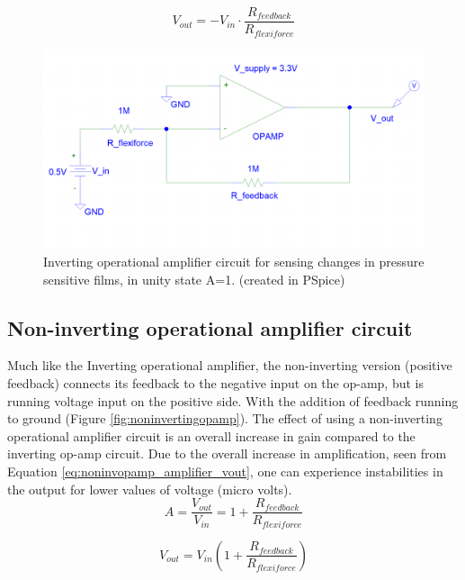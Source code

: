 \begin{equation}
\label{eq:invopamp_amplifier_vout}
    V_{out}= -V_{in} \cdot \frac{R_{feedback}}{R_{flexiforce}}
\end{equation}

\begin{figure}
    \centering
    \includegraphics[width=.985\linewidth]{figures/inverting_opamp.png}
    \caption{Inverting operational amplifier circuit for sensing changes in pressure sensitive films, in unity state A=1. (created in PSpice)}
    \label{fig:invertingopamp}
\end{figure}


\subsection{Non-inverting operational amplifier circuit}
\label{subsec:noninvopamp}
Much like the Inverting operational amplifier, the non-inverting version (positive feedback) connects its feedback to the negative input on the op-amp, but is running voltage input on the positive side. With the addition of feedback running to ground (Figure \ref{fig:noninvertingopamp}). The effect of using a non-inverting operational amplifier circuit is an overall increase in gain compared to the inverting op-amp circuit. Due to the overall increase in amplification, seen from Equation \ref{eq:noninvopamp_amplifier_vout}, one can experience instabilities in the output for lower values of voltage (micro volts).
\begin{equation}
\label{eq:noninvopamp_amplifier}
    A = \frac{V_{out}}{V_{in}} = 1 + \frac{R_{feedback}}{R_{flexiforce}}
\end{equation}

\begin{equation}
\label{eq:noninvopamp_amplifier_vout}
    V_{out} = V_{in}(1 + \frac{R_{feedback}}{R_{flexiforce}})
\end{equation}

